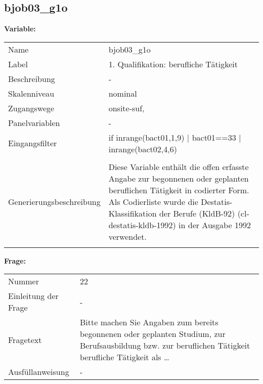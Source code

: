 	
	
	\subsection{bjob03\_g1o}
	\label{subSection:bjob03_g1o}

	\noindent\textbf{Variable:}\\
		\begin{tabular}{lL{11.3cm}}
			\label{tableVariable:bjob03_g1o}
			Name & bjob03\_g1o \\
			Label & 1. Qualifikation: berufliche Tätigkeit \\
			Beschreibung & - \\
			Skalenniveau & nominal \\
			Zugangswege &
				onsite-suf,
 \\
			Panelvariablen & -
			 \\
			Eingangsfilter & if inrange(bact01,1,9) | bact01==33 | inrange(bact02,4,6)  \\
 \\
					Generierungsbeschreibung & Diese Variable enthält die offen erfasste Angabe zur begonnenen oder geplanten beruflichen Tätigkeit in codierter Form. Als Codierliste wurde die Destatis-Klassifikation der Berufe (KldB-92) (cl-destatis-kldb-1992) in der Ausgabe 1992 verwendet. 
				 \\	
			 \\
		\end{tabular}

		\vspace*{1 cm}
		\noindent\textbf{Frage:}\\
		\begin{tabular}{lL{11.3cm}}
			\label{tableQuestion:bjob03_g1o}
			Nummer & 22 \\
			Einleitung der Frage & - \\
			Fragetext & Bitte machen Sie Angaben zum bereits begonnenen oder geplanten Studium, zur Berufsausbildung bzw. zur beruflichen Tätigkeit
berufliche Tätigkeit als … \\
			Ausfüllanweisung & - \\
		\end{tabular}





